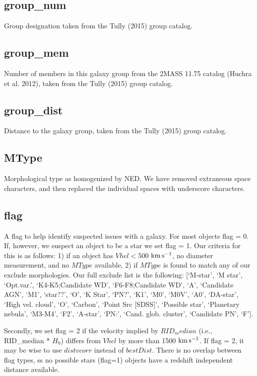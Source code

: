 \documentclass[iop]{emulateapj-rtx4}
\newcommand{\kms}{$\rm km\, s^{-1}$}
\begin{document}
\subsection{group\_num}
Group designation taken from the Tully (2015) group catalog.

\subsection{group\_mem}
Number of members in this galaxy group from the 2MASS 11.75 catalog (Huchra et al. 2012), taken from the Tully (2015) group catalog.

\subsection{group\_dist}
Distance to the galaxy group, taken from the Tully (2015) group catalog.

\subsection{MType}
Morphological type as homogenized by NED. We have removed extraneous space characters, and then replaced the individual spaces with underscore characters.

\subsection{flag}
A flag to help identify suspected issues with a galaxy. For most objects flag = 0. If, however, we suspect an object to be a star we set flag = 1. Our criteria for this is as follows: 1) if an object has $Vhel < 500$ \kms, no diameter measurement, and no $MType$ available, 2) if $MType$ is found to match any of our exclude morphologies. Our full exclude list is the following: [`M-star', `M star', `Opt.var.', `K4-K5;Candidate WD', `F6-F8;Candidate WD', `A', `Candidate AGN', `M1', `star??', `O', `K Star', `PN?', `K1', `M0', `M0V', `A0', `DA-star', `High vel. cloud', `O', `Carbon', `Point Src [SDSS]', `Possible star', `Planetary nebula', `M3-M4', `F2', `A-star', `PN:', `Cand. glob. cluster', `Candidate PN', `F'].

Secondly, we set flag = 2 if the velocity implied by $RID_median$ (i.e., RID\_median * $H_0$) differs from $Vhel$ by more than 1500 \kms. If flag = 2, it may be wise to use $distvcorr$ instead of $bestDist$. There is no overlap between flag types, ss no possible stars (flag=1) objects have a redshift independent distance available.
\end{document}
